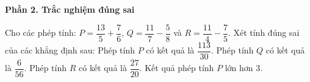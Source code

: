 \textbf{Phần 2. Trắc nghiệm đúng sai}

\begin{ex} %
Cho các phép tính: $P = \dfrac{13}{5} + \dfrac{7}{6}$, $Q = \dfrac{11}{7} - \dfrac{5}{8}$ và $R = \dfrac{11}{4} - \dfrac{7}{5}$. Xét tính đúng sai của các khẳng định sau:
\choiceTF
{\True Phép tính $P$ có kết quả là $\dfrac{113}{30}$.}
{Phép tính $Q$ có kết quả là $\dfrac{6}{56}$.}
{\True Phép tính $R$ có kết quả là $\dfrac{27}{20}$.}
{\True Kết quả phép tính $P$ lớn hơn $3$.}
\end{ex}

